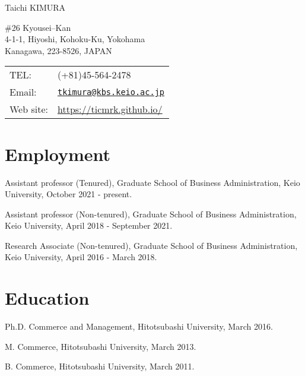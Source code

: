 \documentclass[letterpaper,uplatex]{article}
\def\name{Taichi KIMURA}
\renewenvironment{itemize}{
  \begin{list}{}{
    \setlength{\leftmargin}{1.5em}
  }
}{
  \end{list}
}
\begin{document}
{\LARGE \name}


\vspace{0.25in}

\begin{minipage}{0.45\linewidth}
  \#26 Kyousei--Kan \\
  4-1-1, Hiyoshi, Kohoku-Ku, Yokohama \\
  Kanagawa, 223-8526, JAPAN
\end{minipage}
\begin{minipage}{0.45\linewidth}
  \begin{tabular}{ll}
    TEL: & (+81)45-564-2478 \\
    Email: & \href{mailto:tkimura@kbs.keio.ac.jp}{\tt tkimura@kbs.keio.ac.jp}\\
    Web site: & \url{https://ticmrk.github.io/}
  \end{tabular}
\end{minipage}

\section*{Employment}

\begin{itemize}
    \item Assistant professor (Tenured), Graduate School of Business Administration, Keio University, October 2021 - present.
     \item Assistant professor (Non-tenured), Graduate School of Business Administration, Keio University, April 2018 - September 2021.
     \item Research Associate (Non-tenured), Graduate School of Business Administration, Keio University, April 2016 - March 2018.
\end{itemize}

\section*{Education}

\begin{itemize}
  \item Ph.D. Commerce and Management, Hitotsubashi University, March 2016.
  \item M. Commerce, Hitotsubashi University, March 2013.
  \item B. Commerce, Hitotsubashi University, March 2011.
\end{itemize}
\end{document}
